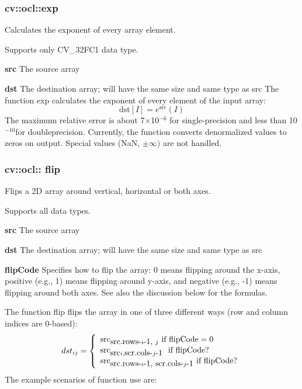 \documentclass{article}
\begin{document}
\newpage

\subsubsection{cv::ocl::exp }
\label{subsubsec:mylabel14}
Calculates the exponent of every array element.

Supports only CV{\_}32FC1 data type.

\textbf{src }The source array

\textbf{dst }The destination array; will have the same size and same type as
src The function exp calculates the exponent of every element of the input
array:
\[
\mbox{dst}\left[ I \right]=e^{\mbox{src}}\left( I \right)
\]
The maximum relative error is about 7$\times $10$^{-6}$ for single-precision
and less than 10$^{-10}$for doubleprecision. Currently, the function
converts denormalized values to zeros on output. Special values (NaN, $\pm
\infty )$ are not handled.

\newpage

\subsubsection{cv::ocl:: flip }
\label{subsubsec:mylabel15}
Flips a 2D array around vertical, horizontal or both axes.

Supports all data types.

\textbf{src }The source array

\textbf{dst }The destination array; will have the same size and same type as
src

\textbf{flipCode }Specifies how to flip the array: 0 means flipping around
the x-axis, positive (e.g., 1) means flipping around y-axis, and negative
(e.g., -1) means flipping around both axes. See also the discussion below
for the formulas.

The function flip flips the array in one of three different ways (row and
column indices are 0-based):
\[
dst_{ij} =\left\{ {{\begin{array}{*{20}c}
 {\mbox{src}_{\mbox{src.rows-}i\mbox{-1, }j} \mbox{ if flipCode}=0} \hfill
\\
 {\mbox{src}_{\mbox{src}i,\mbox{scr.cols-}j\mbox{-1 }} \mbox{ if
flipCode}?} \hfill \\
 {\mbox{src}_{\mbox{src.rows-}i\mbox{-1, scr.cols-}j\mbox{-1}} \mbox{ if
flipCode}?} \hfill \\
\end{array} }} \right.
\]
The example scenarios of function use are:
\end{document}
